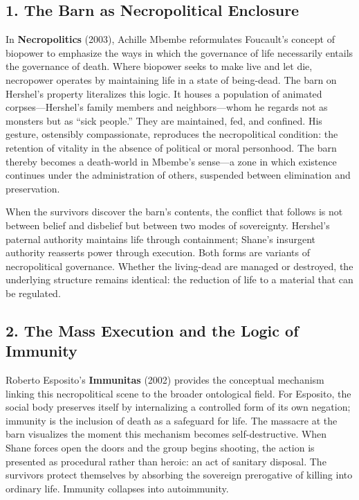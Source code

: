 \documentclass[11pt]{article}
\begin{document}
\subsection*{1. The Barn as Necropolitical Enclosure}
\label{sec:org35b40c8}

In \textbf{Necropolitics} (2003), Achille Mbembe reformulates Foucault’s concept of biopower to emphasize the ways in which the governance of life necessarily entails the governance of death.  Where biopower seeks to make live and let die, necropower operates by maintaining life in a state of being-dead.  The barn on Hershel’s property literalizes this logic.  It houses a population of animated corpses—Hershel’s family members and neighbors—whom he regards not as monsters but as “sick people.”  They are maintained, fed, and confined.  His gesture, ostensibly compassionate, reproduces the necropolitical condition: the retention of vitality in the absence of political or moral personhood.  The barn thereby becomes a death-world in Mbembe’s sense—a zone in which existence continues under the administration of others, suspended between elimination and preservation.  

When the survivors discover the barn’s contents, the conflict that follows is not between belief and disbelief but between two modes of sovereignty.  Hershel’s paternal authority maintains life through containment; Shane’s insurgent authority reasserts power through execution.  Both forms are variants of necropolitical governance.  Whether the living-dead are managed or destroyed, the underlying structure remains identical: the reduction of life to a material that can be regulated.
\subsection*{2. The Mass Execution and the Logic of Immunity}
\label{sec:orgfa7b6d3}

Roberto Esposito’s \textbf{Immunitas} (2002) provides the conceptual mechanism linking this necropolitical scene to the broader ontological field.  For Esposito, the social body preserves itself by internalizing a controlled form of its own negation; immunity is the inclusion of death as a safeguard for life.  The massacre at the barn visualizes the moment this mechanism becomes self-destructive.  When Shane forces open the doors and the group begins shooting, the action is presented as procedural rather than heroic: an act of sanitary disposal.  The survivors protect themselves by absorbing the sovereign prerogative of killing into ordinary life.  Immunity collapses into autoimmunity.  
\end{document}

